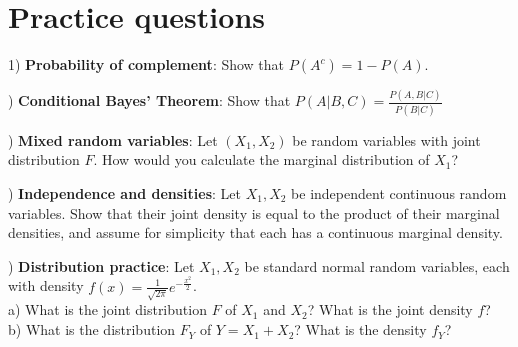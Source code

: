 \documentclass[12pt,english]{article}
\begin{document}
\section{Practice questions}

1) \textbf{Probability of complement}: Show that $P(A^{c}) = 1 - P(A)$.

\vspace{1em}
) \textbf{Conditional Bayes' Theorem}: Show that $P(A | B, C) = \frac{P(A, B | C)}{P(B | C)}$

\vspace{1em}
) \textbf{Mixed random variables}: Let $(X_{1}, X_{2})$ be random variables with joint distribution $F$. How would you calculate the marginal distribution of $X_{1}$?

\vspace{1em}
) \textbf{Independence and densities}: Let $X_{1}, X_{2}$ be independent continuous random variables. Show that their joint density is equal to the product of their marginal densities, and assume for simplicity that each has a continuous marginal density.

\vspace{1em}
) \textbf{Distribution practice}: Let $X_{1}, X_{2}$ be standard normal random variables, each with density $f(x) = \frac{1}{\sqrt{2\pi}} e^{-\frac{x^{2}}{2}}$. \\
a) What is the joint distribution $F$ of $X_{1}$ and $X_{2}$? What is the joint density $f$? \\
b) What is the distribution $F_{Y}$ of $Y = X_{1} + X_{2}$? What is the density $f_{Y}$? \\
\end{document}
